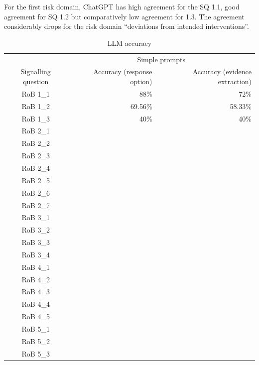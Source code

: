 \documentclass[sn-mathphys,Numbered]{sn-jnl}%
\theoremstyle{thmstyleone}%
\theoremstyle{thmstyletwo}%
\theoremstyle{thmstylethree}%
\begin{document}
For the first risk domain, ChatGPT has high agreement for the SQ 1.1, good agreement for SQ 1.2 but comparatively low agreement for 1.3.
The agreement considerably drops for the risk domain ``deviations from intended interventions''.
%
%
%
\begin{table}[htb]
    \caption{LLM accuracy}
    \label{table:LLM_eval}
    \centering
    \begin{tabular}{crr}
    \hline
     & \multicolumn{2}{c}{Simple prompts} \\
        Signalling question & Accuracy (response option) & Accuracy (evidence extraction) \\ 
    \hline
        RoB 1\_1 & 88\% & 72\% \\ 
        RoB 1\_2 & 69.56\% & 58.33\%  \\ 
        RoB 1\_3 & 40\% & 40\% \\ 
        RoB 2\_1 & &  \\ 
        RoB 2\_2 & &  \\ 
        RoB 2\_3 & &  \\ 
        RoB 2\_4 & &  \\ 
        RoB 2\_5 & &  \\ 
        RoB 2\_6 & &  \\ 
        RoB 2\_7 & &  \\ 
        RoB 3\_1 & &  \\ 
        RoB 3\_2 & &  \\ 
        RoB 3\_3 & &  \\ 
        RoB 3\_4 & &  \\ 
        RoB 4\_1 & & \\ 
        RoB 4\_2 & & \\ 
        RoB 4\_3 & &  \\ 
        RoB 4\_4 & &  \\ 
        RoB 4\_5 & &  \\ 
        RoB 5\_1 & &  \\ 
        RoB 5\_2 & &  \\ 
        RoB 5\_3 & &  \\ \hline
   \end{tabular}
\end{table}
%
%
%
\end{document}
